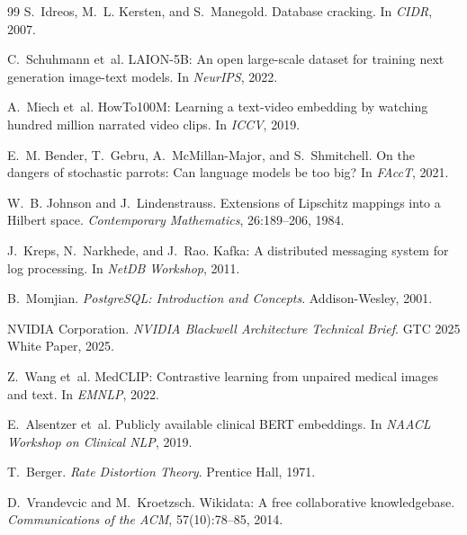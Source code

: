 ﻿\documentclass[12pt,a4paper]{article}
\begin{document}
\begin{thebibliography}{99}
S.~Idreos, M.~L. Kersten, and S.~Manegold.
\newblock Database cracking.
\newblock In \textit{CIDR}, 2007.

C.~Schuhmann et~al.
\newblock LAION-5B: An open large-scale dataset for training next generation
  image-text models.
\newblock In \textit{NeurIPS}, 2022.

A.~Miech et~al.
\newblock HowTo100M: Learning a text-video embedding by watching hundred
  million narrated video clips.
\newblock In \textit{ICCV}, 2019.

E.~M. Bender, T.~Gebru, A.~McMillan-Major, and S.~Shmitchell.
\newblock On the dangers of stochastic parrots: Can language models be too
  big?
\newblock In \textit{FAccT}, 2021.

W.~B. Johnson and J.~Lindenstrauss.
\newblock Extensions of Lipschitz mappings into a Hilbert space.
\newblock \textit{Contemporary Mathematics}, 26:189--206, 1984.

J.~Kreps, N.~Narkhede, and J.~Rao.
\newblock Kafka: A distributed messaging system for log processing.
\newblock In \textit{NetDB Workshop}, 2011.

B.~Momjian.
\newblock \textit{PostgreSQL: Introduction and Concepts}.
\newblock Addison-Wesley, 2001.

NVIDIA Corporation.
\newblock \textit{NVIDIA Blackwell Architecture Technical Brief}.
\newblock GTC 2025 White Paper, 2025.

Z.~Wang et~al.
\newblock MedCLIP: Contrastive learning from unpaired medical images and text.
\newblock In \textit{EMNLP}, 2022.

E.~Alsentzer et~al.
\newblock Publicly available clinical BERT embeddings.
\newblock In \textit{NAACL Workshop on Clinical NLP}, 2019.

T.~Berger.
\newblock \textit{Rate Distortion Theory}.
\newblock Prentice Hall, 1971.

D.~Vrandevcic and M.~Kroetzsch.
\newblock Wikidata: A free collaborative knowledgebase.
\newblock \textit{Communications of the ACM}, 57(10):78--85, 2014.


\end{thebibliography}
\end{document}
